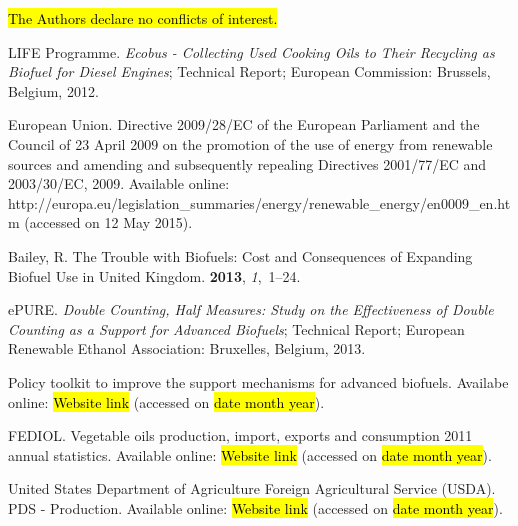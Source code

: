 \documentclass[sustainability,article,accept,moreauthors,pdftex,12pt,a4paper]{mdpi}
\begin{document}

\hl{The Authors declare no conflicts of interest.}


\break
\makeatletter
\renewcommand\@biblabel[1]{#1.}
\makeatother





\begin{thebibliography}{----}


{LIFE Programme}.
\newblock \textit{Ecobus - Collecting Used Cooking Oils to Their Recycling as Biofuel
 for Diesel Engines};
\newblock Technical Report; European Commission: Brussels, Belgium, 2012.

{European Union}.
\newblock Directive 2009/28/EC of the European Parliament and the Council of 23
 April 2009 on the promotion of the use of energy from renewable sources and
 amending and subsequently repealing Directives 2001/77/EC and 2003/30/EC, 2009. Available online: http://europa.eu/legislation\_summaries/energy/renewable\_energy/en0009\_en.htm (accessed on 12 May 2015).


Bailey, R.
\newblock The Trouble with Biofuels: Cost and Consequences of Expanding Biofuel
 Use in United Kingdom.
 {\bf 2013}, {\em 1},~1--24.

ePURE.
\newblock \textit{Double Counting, Half Measures: Study on the Effectiveness of Double
Counting as a Support for Advanced Biofuels};
\newblock Technical Report; European Renewable Ethanol Association: Bruxelles, Belgium, 2013.

Policy toolkit to improve the support mechanisms for advanced biofuels. Availabe online: \hl{Website link } (accessed on \hl{date month year}).

FEDIOL. 
\newblock Vegetable oils production, import, exports and consumption 2011
 annual statistics. Available online: \hl{Website link } (accessed on \hl{date month year}).

{United States Department of Agriculture Foreign Agricultural Service (USDA)}.
\newblock PDS - Production. Available online: \hl{Website link } (accessed on \hl{date month year}).


\end{thebibliography}
\end{document}
